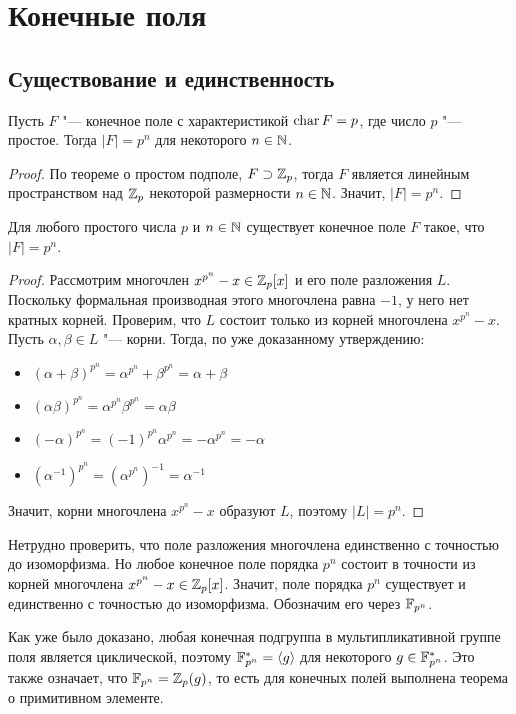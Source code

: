 \section{Конечные поля}

\subsection{Существование и единственность}

\begin{proposition}
	Пусть $F$ "--- конечное поле с характеристикой $\operatorname{char}{F} = p$, где число $p$ "--- простое. Тогда $|F| = p^n$ для некоторого $n \in \mathbb{N}$.
\end{proposition}

\begin{proof}
	По теореме о простом подполе, $F \supset \mathbb{Z}_p$, тогда $F$ является линейным пространством над $\mathbb{Z}_p$ некоторой размерности $n \in \mathbb{N}$. Значит, $|F| = p^n$.
\end{proof}

\begin{proposition}
	Для любого простого числа $p$ и $n \in \mathbb{N}$ существует конечное поле $F$ такое, что $|F| = p^n$.
\end{proposition}

\begin{proof}
	Рассмотрим многочлен $x^{p^n} - x \in \mathbb{Z}_p[x]$ и его поле разложения $L$. Поскольку формальная производная этого многочлена равна $-1$, у него нет кратных корней. Проверим, что $L$ состоит только из корней многочлена $x^{p^n} - x$. Пусть $\alpha, \beta \in L$ "--- корни. Тогда, по уже доказанному утверждению:
	\begin{itemize}
		\item $(\alpha + \beta)^{p^n} = \alpha^{p^n} + \beta^{p^n} = \alpha + \beta$
		\item $(\alpha\beta)^{p^n} = \alpha^{p^n}\beta^{p^n} = \alpha\beta$
		\item $(-\alpha)^{p^n} = (-1)^{p^n}\alpha^{p^n} = -\alpha^{p^n} = -\alpha$
		\item $(\alpha^{-1})^{p^n} = (\alpha^{p^n})^{-1} = \alpha^{-1}$
	\end{itemize}

	Значит, корни многочлена $x^{p^n} - x$ образуют $L$, поэтому $|L| = p^n$.
\end{proof}

\begin{note}
	Нетрудно проверить, что поле разложения многочлена единственно с точностью до изоморфизма. Но любое конечное поле порядка $p^n$ состоит в точности из корней многочлена $x^{p^n} - x \in \mathbb{Z}_p[x]$. Значит, поле порядка $p^n$ существует и единственно с точностью до изоморфизма. Обозначим его через $\mathbb{F}_{p^n}$.
\end{note}

\begin{note}
	Как уже было доказано, любая конечная подгруппа в мультипликативной группе поля является циклической, поэтому $\mathbb{F}_{p^n}^* = \langle g\rangle$ для некоторого $g \in \mathbb{F}_{p^n}^*$. Это также означает, что $\mathbb{F}_{p^n} = \mathbb{Z}_p(g)$, то есть для конечных полей выполнена теорема о примитивном элементе.
\end{note}